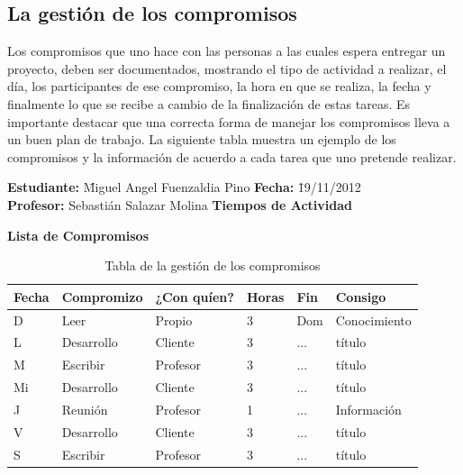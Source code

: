 \documentclass[a4paper,12pt,openany,oneside]{book}
\begin{document}
\subsection{La gestión de los compromisos}
Los compromisos que uno hace con las personas a las cuales espera entregar un proyecto, deben ser documentados, mostrando el tipo de actividad a realizar, el día, los participantes de ese compromiso, la hora en que se realiza, la fecha y finalmente lo que se recibe a cambio de la finalización de estas tareas. Es importante destacar que una correcta forma de manejar los compromisos lleva a un buen plan de trabajo. La siguiente tabla muestra un ejemplo de los compromisos y la información de acuerdo a cada tarea que uno pretende realizar.
\begin{table}[!ht]
\begin{tabbing}
\textbf{Estudiante:} \= Miguel Angel Fuenzaldia Pino \= \textbf{Fecha:} \= 19/11/2012\\
\textbf{Profesor:} \> Sebastián Salazar Molina \> \textbf{Tiempos de Actividad} \>  \\
\end{tabbing}
\textbf{Lista de Compromisos}\\
\begin{tabular}{| l | l | l | l | l | l |}
\hline
\textbf{Fecha} & \textbf{Compromizo} & \textbf{¿Con quíen?} & \textbf{Horas} & \textbf{Fin} & \textbf{Consigo} \\
\hline
D  & Leer       & Propio   & 3 & Dom & Conocimiento \\
\hline
L  & Desarrollo & Cliente  & 3 & ... & título \\
\hline
M  & Escribir   & Profesor & 3 & ... & título \\
\hline
Mi & Desarrollo & Cliente  & 3 & ... & título \\
\hline
J  & Reunión    & Profesor & 1 & ... & Información \\
\hline
V  & Desarrollo & Cliente  & 3 & ... & título \\
\hline
S  & Escribir   & Profesor & 3 & ... & título \\
\hline
\end{tabular}
\caption{Tabla de la gestión de los compromisos}
\end{table}
\end{document}

